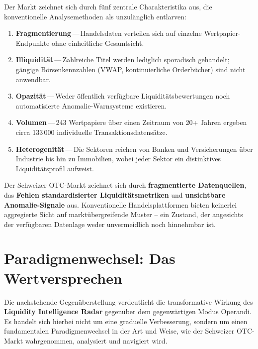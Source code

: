 \documentclass[11pt, a4paper, oneside, openany]{report}
\newcommand{\term}[1]{\textcolor{SwissRed}{\textsf{\textbf{#1}}}}
\begin{document}
Der Markt zeichnet sich durch fünf zentrale Charakteristika aus, die konventionelle Analysemethoden als unzulänglich entlarven:

\begin{enumerate}[label=\textcolor{SwissRed}{\textbf{\arabic*.}}]
  \item \textbf{Fragmentierung}\,---\,Handelsdaten verteilen sich auf einzelne Wertpapier-Endpunkte ohne einheitliche Gesamtsicht.
  \item \textbf{Illiquidität}\,---\,Zahlreiche Titel werden lediglich sporadisch gehandelt; gängige Börsenkennzahlen (VWAP, kontinuierliche Orderbücher) sind nicht anwendbar.
  \item \textbf{Opazität}\,---\,Weder öffentlich verfügbare Liquiditätsbewertungen noch automatisierte Anomalie-Warnsysteme existieren.
  \item \textbf{Volumen}\,---\,243 Wertpapiere über einen Zeitraum von 20+ Jahren ergeben circa 133\,000 individuelle Transaktionsdatensätze.
  \item \textbf{Heterogenität}\,---\,Die Sektoren reichen von Banken und Versicherungen über Industrie bis hin zu Immobilien, wobei jeder Sektor ein distinktives Liquiditätsprofil aufweist.
\end{enumerate}

\begin{infobox}[Problemstellung]
Der Schweizer OTC-Markt zeichnet sich durch \textbf{fragmentierte Datenquellen}, das \textbf{Fehlen standardisierter Liquiditätsmetriken} und \textbf{unsichtbare Anomalie-Signale} aus. Konventionelle Handelsplattformen bieten keinerlei aggregierte Sicht auf marktübergreifende Muster -- ein Zustand, der angesichts der verfügbaren Datenlage weder unvermeidlich noch hinnehmbar ist.
\end{infobox}

\section{Paradigmenwechsel: Das Wertversprechen}
\label{sec:paradigmenwechsel}

Die nachstehende Gegenüberstellung verdeutlicht die transformative Wirkung des \term{Liquidity Intelligence Radar} gegenüber dem gegenwärtigen Modus Operandi. Es handelt sich hierbei nicht um eine graduelle Verbesserung, sondern um einen fundamentalen Paradigmenwechsel in der Art und Weise, wie der Schweizer OTC-Markt wahrgenommen, analysiert und navigiert wird.
\end{document}

